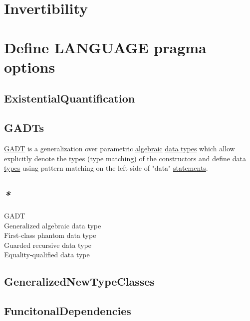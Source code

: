 \documentclass[a4paper,14pt,oneside]{book}
\begin{document}
\chapter{\label{orga188c46}Invertibility}
\label{sec:org7f79bd5}
\chapter{\label{org8838df3}Define LANGUAGE pragma options}
\label{sec:org7d339d3}

\section{\label{orgcdf1f1f}ExistentialQuantification}
\label{sec:org33a0ca2}

\section{\label{org9147a7d}GADTs}
\label{sec:org95dbeca}

\hyperref[org2a21b8d]{GADT} is a generalization over parametric \hyperref[orgee35152]{algebraic} \hyperref[orgf2a6cad]{data types} which allow explicitly denote the \hyperref[org430d788]{types} (\hyperref[orgdbcea73]{type} matching) of the \hyperref[org89591e4]{constructors} and define \hyperref[orgf2a6cad]{data types} using pattern matching on the left side of "data" \hyperref[org878aa00]{statements}.\\

\section{\emph{*}}
\label{sec:org77c9ac2}

\label{org2a21b8d}GADT\\
\label{org441f8f4}Generalized algebraic data type\\
\label{org808f60a}First-class phantom data type\\
\label{org1cfd456}Guarded recursive data type\\
\label{orgcf81b4b}Equality-qualified data type\\

\section{\label{org11a6e72}GeneralizedNewTypeClasses}
\label{sec:org7929746}

\section{\label{orgac07e72}FuncitonalDependencies}
\label{sec:orge909999}
\end{document}
